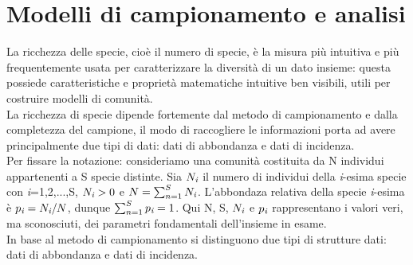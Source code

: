 \chapter{Modelli di campionamento e analisi}









La ricchezza delle specie, cioè il numero di specie, è la misura più intuitiva e più frequentemente usata per caratterizzare la diversità di un dato insieme: questa possiede caratteristiche e proprietà matematiche intuitive ben visibili, utili per costruire modelli di comunità. \\
La ricchezza di specie dipende fortemente dal metodo di campionamento e dalla completezza del campione, il modo di raccogliere le informazioni porta ad avere principalmente due tipi di dati: dati di abbondanza e dati di incidenza.\\
Per fissare la notazione: consideriamo una comunità costituita da N individui appartenenti a S specie distinte. Sia $N_\emph{i}$ il numero di individui della \emph{i}-esima specie con \emph{i}=1,2,...,S, $N_\emph{i}>0$ e $N=\sum_{n=1}^S N_\emph{i}$.
L'abbondaza relativa della specie \emph{i}-esima è $p_\emph{i}=N_\emph{i}/N$, dunque $\sum_{n=1}^S p_\emph{i}=1$. Qui N, S, $N_\emph{i}$ e $p_\emph{i}$ rappresentano i valori veri, ma sconosciuti, dei parametri fondamentali dell'insieme in esame.\\
In base al metodo di campionamento si distinguono due tipi di strutture dati: dati di abbondanza e dati di incidenza\cite{doi:ChaoChiu2016}.


